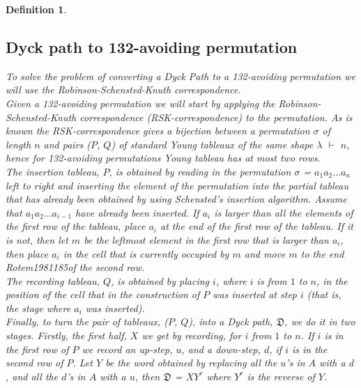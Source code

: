 \documentclass[12pt]{article}
\newtheorem{definition}{Definition}
\newcommand{\DyckP}{\mathfrak{D}}
\begin{document}
\begin{definition}
\subsection{Dyck path to 132-avoiding permutation}
\label{sec:backwardsStandard}
To solve the problem of converting a Dyck Path to a 132-avoiding permutation we will use the Robinson-Schensted-Knuth correspondence.\\
Given a 132-avoiding permutation we will start by applying the Robinson-Schensted-Knuth correspondence (RSK-correspondence) to the permutation. As is known the RSK-correspondence gives a bijection between a permutation $\sigma$ of length $n$ and pairs ($P$, $Q$) of {\it standard Young tableaux} of the same shape $\lambda$  $\vdash$ $n$, hence for 132-avoiding permutations Young tableau has at most two rows.\\
The {\it insertion tableau}, $P$, is obtained by reading in the permutation $\sigma$ = $a_{1}a_{2}...a_{n}$ left to right and inserting the element of the permutation into the partial tableau that has already been obtained by using Schensted's insertion algorithm. Assume that $a_{1}a_{2}...a_{i-1}$ have already been inserted. If $a_{i}$ is larger than all the elements of the first row of the tableau, place $a_{i}$ at the end of the first row of the tableau. If it is not, then let $m$ be the leftmost element in the first row that is larger than $a_{i}$, then place $a_{i}$ in the cell that is currently occupied by $m$ and move $m$ to the end Rotem1981185of the second row.\\
The {\it recording tableau}, $Q$, is obtained by placing $i$, where $i$ is from $1$ to $n$, in the position of the cell that in the construction of $P$ was inserted at step $i$ (that is, the stage where $a_{i}$ was inserted).\\
Finally, to turn the pair of tableaux, ($P$, $Q$), into a Dyck path, $\DyckP$, we do it in two stages. Firstly, the first half, $X$ we get by recording, for $i$ from $1$ to $n$. If $i$ is in the first row of $P$ we record an up-step, $u$, and a down-step, $d$, if $i$ is in the second row of $P$. Let $Y$ be the word obtained by replacing all the $u$'s in $A$ with a $d$, and all the $d$'s in $A$ with a $u$, then $\DyckP$ = $XY^r$ where $Y^r$ is the reverse of $Y$.


\end{definition}
\end{document}
